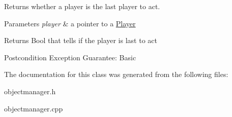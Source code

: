Returns whether a player is the last player to act. 


\begin{DoxyParams}{Parameters}
{\em player} & a pointer to a \hyperlink{classPlayer}{Player} \\
\hline
\end{DoxyParams}
\begin{DoxyReturn}{Returns}
Bool that tells if the player is last to act 
\end{DoxyReturn}
\begin{DoxyPostcond}{Postcondition}
Exception Guarantee\-: Basic 
\end{DoxyPostcond}


The documentation for this class was generated from the following files\-:\begin{DoxyCompactItemize}
\item 
objectmanager.\-h\item 
objectmanager.\-cpp\end{DoxyCompactItemize}
